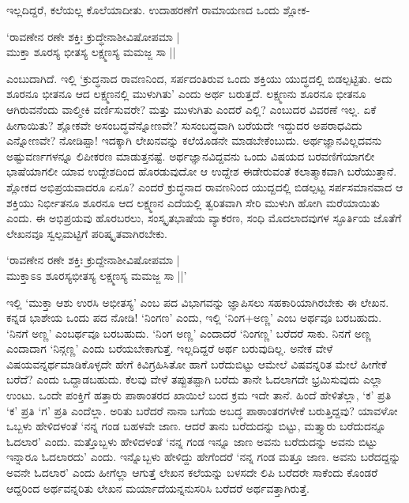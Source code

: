 ಇಲ್ಲದಿದ್ದರೆ, ಕಲೆಯಲ್ಲ ಕೊಲೆಯಾದೀತು. ಉದಾಹರಣೆಗೆ ರಾಮಾಯಣದ ಒಂದು ಶ್ಲೋಕ-

\begin{shloka}
`ರಾವಣೇನ ರಣೇ ಶಕ್ತಿಃ ಕ್ರುದ್ಧೇನಾಶೀವಿಷೋಪಮಾ |\\
ಮುಕ್ತಾ ಶೂರಸ್ಯ ಭೀತಸ್ಯ ಲಕ್ಷ್ಮಣಸ್ಯ ಮಮಜ್ಜ ಸಾ ||
\end{shloka}
ಎಂಬುದಾಗಿದೆ. ಇಲ್ಲಿ `ಕ್ರುದ್ಧನಾದ ರಾವಣನಿಂದ, ಸರ್ಪದಂತಿರುವ ಒಂದು ಶಕ್ತಿಯು ಯುದ್ಧದಲ್ಲಿ ಬಿಡಲ್ಪಟ್ಟಿತು. ಅದು ಶೂರನೂ ಭೀತನೂ ಆದ ಲಕ್ಷ್ಮಣನಲ್ಲಿ ಮುಳುಗಿತು' ಎಂದು ಅರ್ಥ ಬರುತ್ತದೆ. ಲಕ್ಷ್ಮಣನು ಶೂರನೂ ಭೀತನೂ ಆಗಿರುವನೆಂದು ವಾಲ್ಮೀಕಿ ವರ್ಣಿಸುವರೇ? ಮತ್ತು ಮುಳುಗಿತು ಎಂದರೆ ಎಲ್ಲಿ? ಎಂಬುದರ ವಿವರಣೆ ಇಲ್ಲ. ಏಕೆ ಹೀಗಾಯಿತು? ಶ್ಲೋಕವೇ ಅಸಂಬದ್ಧವೆನ್ನೋಣವೇ? ಸುಸಂಬದ್ಧವಾಗಿ ಬರೆಯದೇ ಇದ್ದುದರ ಅಪರಾಧವಿದು ಎನ್ನೋಣವೇ? ನೋಡಿಪ್ಪಾ! ಇದಕ್ಕಾಗಿ ಲೇಖನವನ್ನು ಕಲೆಯೊಡನೇ ಮಾಡಬೇಕೆಂಬುದು. ಅರ್ಥಜ್ಞಾನವಿಲ್ಲದವನು ಅಷ್ಟುವರ್ಣಗಳನ್ನೂ ಲಿಪೀಕರಣ ಮಾಡುತ್ತನಷ್ಟೆ. ಅರ್ಥಜ್ಞಾನವಿದ್ದವನು ಒಂದು ವಿಷಯದ ಬರವಣಿಗೆಯಾಗಲೀ ಭಾಷೆಯಾಗಲೀ ಯಾವ ಉದ್ದೇಶದಿಂದ  ಹೊರಡುವುದೋ ಆ ಉದ್ದೇಶ ಈಡೇರುವಂತೆ ಕಲಾತ್ಮಾಕವಾಗಿ ಬರೆಯುತ್ತಾನೆ. ಶ್ಲೋಕದ ಅಭಿಪ್ರಯವಾದರೂ ಏನೂ? ಎಂದರೆ ಕ್ರುದ್ಧನಾದ ರಾವಣನಿಂದ ಯುದ್ದದಲ್ಲಿ ಬಿಡಲ್ಪಟ್ಟ ಸರ್ಪಸಮಾನವಾದ ಆ ಶಕ್ತಿಯು ನಿರ್ಭೀತನೂ ಶೂರನೂ ಆದ ಲಕ್ಷ್ಮಣನ ಎದೆಯಲ್ಲಿ ತ್ವರಿತವಾಗಿ ಸೇರಿ ಮುಳುಗಿ ಹೋಗಿ ಮರೆಯಾಯಿತು ಎಂದು. ಈ ಅಭಿಪ್ರಯವು ಹೊರಬರಲು, ಸಂಸ್ಕೃತಭಾಷೆಯ ವ್ಯಾಕರಣ, ಸಂಧಿ ಮೊದಲಾದವುಗಳ ಸ್ಫೂರ್ತಿಯ ಜೊತೆಗೆ ಲೇಖನವೂ ಸ್ವಲ್ಪಮಟ್ಟಿಗೆ ಪರಿಷ್ಕೃತವಾಗಿರಬೇಕು.

\begin{shloka}
`ರಾವಣೇನ ರಣೇ ಶಕ್ತಿಃ ಕ್ರುದ್ದೇನಾಶೀವಿಷೋಪಮಾ |\\
ಮುಕ್ತಾಽಽ ಶೂರಸ್ಯಭೀತಸ್ಯ ಲಕ್ಷ್ಮಣಸ್ಯ ಮಮಜ್ಜ ಸಾ ||'
\end{shloka}
ಇಲ್ಲಿ `ಮುಕ್ತಾ ಆಶು ಉರಸಿ ಅಭೀತಸ್ಯ' ಎಂಬ ಪದ ವಿಭಾಗವನ್ನು ಜ್ಞಾಪಿಸಲು ಸಹಕಾರಿಯಾಗಿರಬೇಕು ಈ ಲೇಖನ. ಕನ್ನಡ ಭಾಶೇಯ ಒಂದು ಪದ ನೋಡಿ! `ನಿಂಗಣ' ಎಂದು, ಇಲ್ಲಿ  `ನಿಂಗ+ಅಣ್ಣ' ಎಂಬ ಅರ್ಥವೂ ಬರಬಹುದು. `ನಿನಗೆ ಅಣ್ಣ' ಎಂಬರ್ಥವೂ‌ ಬರಬಹುದು. `ನಿಂಗ ಅಣ್ಣ' ಎಂದಾದರೆ `ನಿಂಗಣ್ಣ' ಬರೆದರೆ ಸಾಕು. ನಿನಗೆ ಅಣ್ಣ ಎಂದಾದಾಗ `ನಿನ್ಗಣ್ಣ' ಎಂದು ಬರೆಯಬೇಕಾಗುತ್ತೆ. ಇಲ್ಲದಿದ್ದರೆ ಅರ್ಥ ಬರುವುದಿಲ್ಲ. ಅನೇಕ ವೇಳೆ ವಿಷಯವನ್ನರ್ಥಮಾಡಿಕೊಳ್ಳದೇ ಹೇಗೆ ಕಿವಿಗ್ರಹಿಸಿತೋ ಹಾಗೆ ಬರೆದುಬಿಟ್ಟು ಆಮೇಲೆ ವಿಷವನ್ನರಿತ ಮೇಲೆ ಹೀಗೇಕೆ ಬರೆದೆ? ಎಂದು ಒದ್ದಾಡಬಹುದು. ಕೆಲವು ವೇಳೆ ತಪ್ಪುತಪ್ಪಾಗಿ ಬರೆದು ತಾನೇ ಓದಲಾಗದೇ ಭ್ರಮಿಸುವುದು ಎಲ್ಲಾ ಉಂಟು. ಒಂದೇ ಪಂಕ್ತಿಗೆ ಹತ್ತಾರು ಪಾಠಾಂತರದ ಖಾಯಿಲೆ ಬಂದ ಕ್ರಮ ಇದೇ ತಾನೆ. ಹಿಂದೆ ಹೇಳಿತೆಲ್ಲಾ, `ಕ' ಪ್ರತಿ `ಕ' ಪ್ರತಿ `ಗ' ಪ್ರತಿ ಎಂದೆಲ್ಲಾ. ಅರಿತು ಬರೆದರೆ ನಾನಾ ಬಗೆಯ ಅಬದ್ಧ ಪಾಠಾಂತರಗಳೇಕೆ ಬರುತ್ತಿದ್ದವು? ಯಾವಳೋ ಒಬ್ಬಳು ಹೇಳಿದಳಂತೆ `ನನ್ನ ಗಂಡ ಬಹಳವೇ ಜಾಣ. ಆದರೆ ತಾನು ಬರೆದುದನ್ನು ಬಿಟ್ಟು, ಮತ್ತ್ಯಾರು ಬರೆದುದನ್ನೂ ಓದಲಾರ' ಎಂದು. ಮತ್ತೊಬ್ಬಳು ಹೇಳಿದಳಂತೆ `ನನ್ನ ಗಂಡ ಇನ್ನೂ ಜಾಣ ಅವನು ಬರೆದುದನ್ನು ಅವನು ಬಿಟ್ಟು ಇನ್ನಾರೂ ಓದಲಾರದು' ಎಂದು. ಇನ್ನೊಬ್ಬಳು ಹೇಳಿದ್ದು ಹೇಗೆಂದರೆ `ನನ್ನ ಗಂಡ ಮತ್ತೂ ಜಾಣ. ಅವನು ಬರೆದದ್ದನ್ನು ಅವನೇ ಓದಲಾರ' ಎಂದು ಹೀಗೆಲ್ಲಾ ಆಗುತ್ತೆ ಲೇಖನ ಕಲೆಯನ್ನು ಬಳಸದೇ ಲಿಪಿ ಬರೆದರೇ ಸಾಕೆಂದು ಕೊಂಡರೆ ಆದ್ದರಿಂದ ಅರ್ಥವನ್ನರಿತು ಲೇಖನ ಮರ್ಯಾದೆಯನ್ನನುಸರಿಸಿ ಬರೆದರೆ ಅರ್ಥವತ್ತಾಗಿರುತ್ತೆ.

